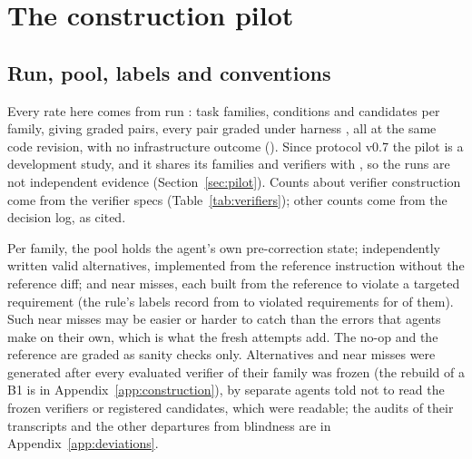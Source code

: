\section{The construction pilot}
\label{app:pilot}

\subsection{Run, pool, labels and conventions}
\label{sec:results-pilot}\label{sec:pools}
Every rate here comes from run \texttt{\PILOTRUN}:  task families,  conditions
and  candidates per family, giving  graded pairs, every pair graded under harness
, all at the same code revision, with no infrastructure outcome (). Since protocol
v0.7 the pilot is a development study, and it shares its families and verifiers with \texttt{\FRESHRUN}, so the runs are
not independent evidence (Section~\ref{sec:pilot}). Counts about verifier construction come from the verifier specs
(Table~\ref{tab:verifiers}); other counts come from the decision log, as cited.

Per family, the pool holds the agent's own pre-correction state;  independently written
valid alternatives, implemented from the reference instruction without the reference diff; and
 near misses, each built from the reference to violate a targeted requirement (the rule's
labels record from  to  violated requirements for  of them).
Such near misses may be easier or harder to catch than the errors that agents make on their own, which is what the fresh
attempts add. The no-op and the reference are graded as sanity checks only. Alternatives and near misses were generated
after every evaluated verifier of their family was frozen (the rebuild of a B1 is in Appendix~\ref{app:construction}),
by separate agents told not to read the frozen verifiers or registered candidates, which were readable; the audits of
their transcripts and the other departures from blindness are in Appendix~\ref{app:deviations}.

